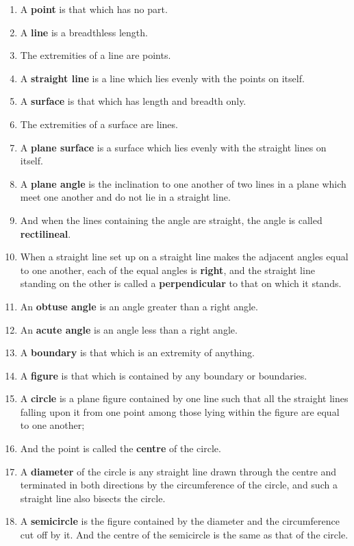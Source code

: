 \documentclass[
]{book}
\providecommand{\tightlist}{%
  \setlength{\itemsep}{0pt}\setlength{\parskip}{0pt}}
\theoremstyle{definition}
\theoremstyle{definition}
\theoremstyle{definition}
\theoremstyle{definition}
\theoremstyle{remark}
\begin{document}
\begin{enumerate}
\def\labelenumi{\arabic{enumi}.}
\tightlist
\item
  A \textbf{point} is that which has no part.
\item
  A \textbf{line} is a breadthless length.
\item
  The extremities of a line are points.
\item
  A \textbf{straight line} is a line which lies evenly with the points on itself.
\item
  A \textbf{surface} is that which has length and breadth only.
\item
  The extremities of a surface are lines.
\item
  A \textbf{plane surface} is a surface which lies evenly with the straight lines on itself.
\item
  A \textbf{plane angle} is the inclination to one another of two lines in a plane which meet one another and do not lie in a straight line.
\item
  And when the lines containing the angle are straight, the angle is called \textbf{rectilineal}.
\item
  When a straight line set up on a straight line makes the adjacent angles equal to one another, each of the equal angles is \textbf{right}, and the straight line standing on the other is called a \textbf{perpendicular} to that on which it stands.
\item
  An \textbf{obtuse angle} is an angle greater than a right angle.
\item
  An \textbf{acute angle} is an angle less than a right angle.
\item
  A \textbf{boundary} is that which is an extremity of anything.
\item
  A \textbf{figure} is that which is contained by any boundary or boundaries.
\item
  A \textbf{circle} is a plane figure contained by one line such that all the straight lines falling upon it from one point among those lying within the figure are equal to one another;
\item
  And the point is called the \textbf{centre} of the circle.
\item
  A \textbf{diameter} of the circle is any straight line drawn through the centre and terminated in both directions by the circumference of the circle, and such a straight line also bisects the circle.
\item
  A \textbf{semicircle} is the figure contained by the diameter and the circumference cut off by it. And the centre of the semicircle is the same as that of the circle.

\end{enumerate}
\end{document}
